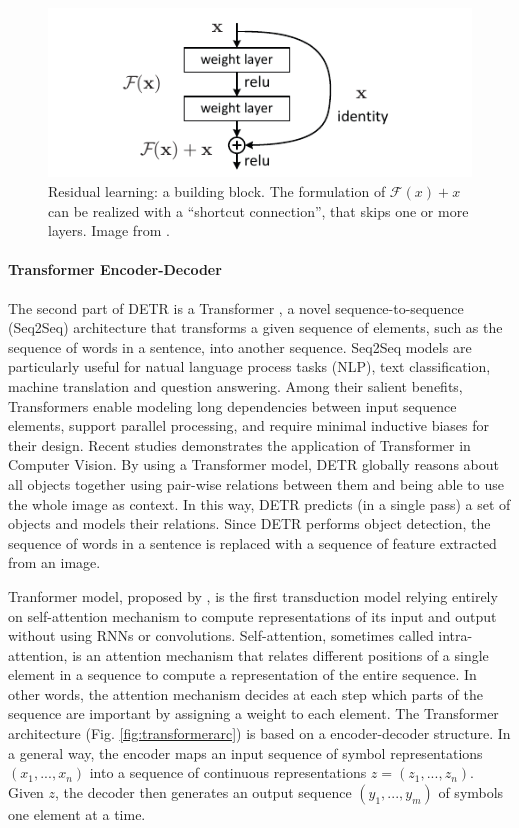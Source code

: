 \begin{figure}[h!]
	\centering
	\includegraphics[width=0.9\linewidth]{images/residualblock.pdf}
	\caption{Residual learning: a building block. The formulation of $\mathcal{F}(x)+x$ can be realized with a ``shortcut connection'', that skips one or more layers. Image from \cite{resnet}.}
	\label{fig:resblock}
\end{figure}

\paragraph{Transformer Encoder-Decoder} The second part of DETR is a Transformer \cite{transformer}, a novel sequence-to-sequence (Seq2Seq) architecture that transforms a given sequence of elements, such as the sequence of words in a sentence, into another sequence. Seq2Seq models are particularly useful for natual language process tasks (NLP), text classification, machine translation and
question answering. Among their salient benefits, Transformers enable modeling long dependencies between input sequence elements, support parallel processing, and require minimal inductive biases for their design. Recent studies \cite{surveytransformer} demonstrates the application of Transformer in Computer Vision. By using a Transformer model, DETR globally reasons about all objects together using pair-wise relations between them and being able to use the whole image as context. In this way, DETR predicts (in a single pass) a set of objects and
models their relations. Since DETR performs object detection, the sequence of words in a sentence is replaced with a sequence of feature extracted from an image.

Tranformer model, proposed by \citeauthor{transformer} \cite{transformer}, is the first transduction model relying entirely on self-attention mechanism to compute representations of its input and output without using RNNs or convolutions. Self-attention, sometimes called intra-attention, is an attention mechanism that relates different positions
of a single element in a sequence to compute a representation of the entire sequence. In other words, the attention mechanism decides at each step which parts of the sequence are important by assigning a weight to each element. The Transformer architecture (Fig. \ref{fig:transformerarc}) is based on a encoder-decoder structure. In a general way, the encoder maps an input sequence of symbol representations $(x_1, ..., x_n)$ into a sequence of continuous representations $z = (z_1, ..., z_n)$. Given $z$, the decoder then generates an output sequence $(y_1, ..., y_m)$ of symbols one element at a time. 

